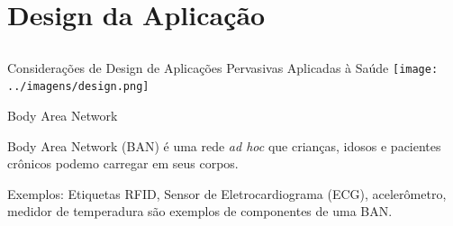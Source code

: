\documentclass{beamer}
\begin{document}
\section{Design da Aplicação}
\subsection{}
\begin{frame}{} 
    \begin{block}{Considerações de Design de Aplicações Pervasivas Aplicadas à Saúde}
      \center \texttt{[image: ../imagens/design.png]}
    \end{block}
\end{frame}


\begin{frame}{Body Area Network}
    \begin{block}{}
      Body Area Network (BAN) é uma rede \textit{ad hoc} que crianças, idosos e pacientes crônicos podemo carregar em seus corpos.
    \end{block}

    \begin{block}{Exemplos:}
     Etiquetas RFID, Sensor de Eletrocardiograma (ECG), acelerômetro, medidor de temperadura são exemplos de componentes de uma BAN.
    \end{block}
\end{frame}

% 
\end{document}

